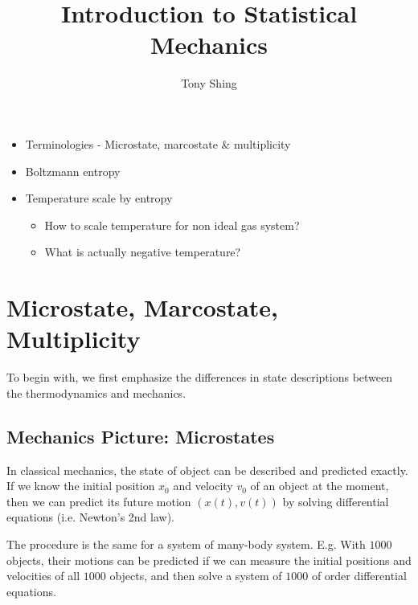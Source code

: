 \documentclass[class=article, crop=false, 12pt]{standalone}
\author{Tony Shing}
\title{Introduction to Statistical Mechanics}
\begin{document}
\maketitle


\begin{overview}
    \begin{itemize}
        \item Terminologies - Microstate, marcostate \& multiplicity
        \item Boltzmann entropy
        \item Temperature scale by entropy
        \begin{itemize}
            \item How to scale temperature for non ideal gas system?
            \item What is actually negative temperature?
        \end{itemize}
    \end{itemize}
\end{overview}




\section{Microstate, Marcostate, Multiplicity}

To begin with,
we first emphasize the differences in state descriptions between the thermodynamics and mechanics.


\subsection{Mechanics Picture: Microstates}

In classical mechanics, 
the state of object can be described and predicted exactly. 
If we know the initial position $x_0$ and velocity $v_0$ of an object at the moment, 
then we can predict its future motion $(x(t), v(t))$ by solving differential equations 
(i.e. Newton's 2nd law). 


The procedure is the same for a system of many-body system. 
E.g. With $1000$ objects, 
their motions can be predicted if we can measure the initial positions and velocities of all $1000$ objects, 
and then solve a system of $1000$ of  order differential equations.\\
\end{document}
